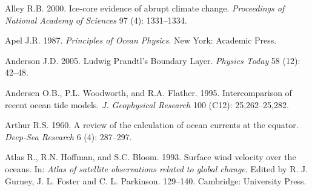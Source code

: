 

\begin{thebibliography}{999}
Alley R.B.  2000. Ice-core evidence of abrupt climate change.
\textit{Proceedings of National Academy of Sciences} 97 (4):
1331--1334.
%

Apel J.R.  1987. \textit{Principles of Ocean Physics}.  New York:
Academic Press.
%

Anderson J.D.  2005. Ludwig Prandtl's Boundary Layer.  \textit{Physics
  Today} 58 (12): 42--48.
%

Andersen O.B., P.L. Woodworth, and R.A. Flather. 1995. Intercomparison
of recent ocean tide models. \textit{J. Geophysical Research} 100
(C12): 25,262--25,282.
%

Arthur R.S.  1960. A review of the calculation of ocean currents at
the equator. \textit{Deep-Sea Research} 6 (4): 287--297.
%

Atlas R., R.N. Hoffman, and S.C. Bloom.  1993. Surface wind velocity
over the oceans. In: \textit{Atlas of satellite observations related
  to global change}. Edited by R. J. Gurney, J. L. Foster and
C. L. Parkinson. 129--140. Cambridge: University Press.
%


\end{thebibliography}
